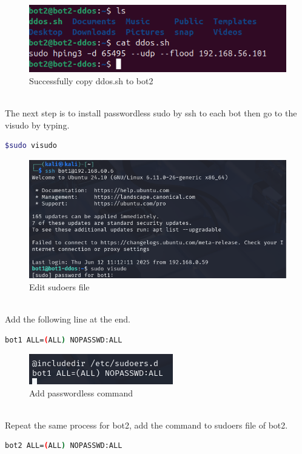 \pagebreak
\begin{figure}[!htb]
    \centering
    \includegraphics[width=0.8\linewidth]{thesis/bot2AfterCopy.png}
    \caption{Successfully copy ddos.sh to bot2}
    \label{fig:enter-label}
\end{figure}
\\ The next step is to install passwordless sudo by ssh to each bot then go to the visudo by typing.
\begin{lstlisting}[language=bash,caption={Setting up passwordless sudo}]
 $sudo visudo
\end{lstlisting}
\begin{figure}[!htb]
    \centering
    \includegraphics[width=0.8\linewidth]{thesis/visudo.png}
    \caption{Edit sudoers file}
    \label{fig:enter-label}
\end{figure}
\\ Add the following line at the end.
\begin{lstlisting}[language=bash,caption={Setting up passwordless sudo on bot1}]
bot1 ALL=(ALL) NOPASSWD:ALL
\end{lstlisting}
\begin{figure}[!htb]
    \centering
    \includegraphics[width=0.5\linewidth]{thesis/passwordless.png}
    \caption{Add passwordless command}
    \label{fig:enter-label}
\end{figure}
\\ 
Repeat the same process for bot2, add the command to sudoers file of bot2.
\begin{lstlisting}[language=bash,caption={Setting up passwordless sudo on bot2}]
bot2 ALL=(ALL) NOPASSWD:ALL
\end{lstlisting}
